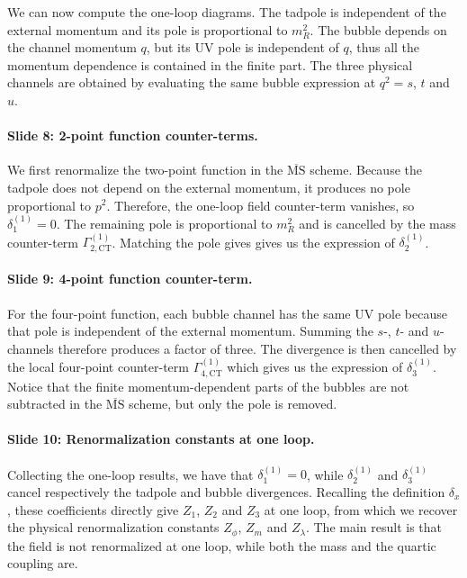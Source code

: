 \documentclass[11pt,a4paper]{article}
\newcommand{\MMS}{\overline{\mathrm{MS}}}
\begin{document}
We can now compute the one-loop diagrams. The tadpole is independent of the external momentum and its pole is proportional to $m_R^2$. The bubble depends on the channel momentum $q$, but its UV pole is independent of $q$, thus all the momentum dependence is contained in the finite part. 
The three physical channels are obtained by evaluating the same bubble expression at $q^2 = s $, $t$ and $u$.

\paragraph{Slide 8: 2-point function counter-terms.}

We first renormalize the two-point function in the $\MMS$ scheme. Because the tadpole does not depend on the external momentum, it produces no pole proportional to $p^2$. Therefore, the one-loop field counter-term vanishes, so $\delta_1^{(1)} = 0$. The remaining pole is proportional to $m_R^2$ and is cancelled by the mass counter-term $\Gamma_{2,\mathrm{CT}}^{(1)}$. Matching the pole gives gives us the expression of $\delta_2^{(1)}$.

\paragraph{Slide 9: 4-point function counter-term.}

For the four-point function, each bubble channel has the same UV pole because that pole is independent of the external momentum. Summing the $s$-, $t$- and $u$-channels therefore produces a factor of three. The divergence is then cancelled by the local four-point counter-term $\Gamma_{4,\mathrm{CT}}^{(1)}$ which gives us the expression of $\delta_3^{(1)}$. Notice that the finite momentum-dependent parts of the bubbles are not subtracted in the $\MMS$ scheme, but only the pole is removed.

\paragraph{Slide 10: Renormalization constants at one loop.}

Collecting the one-loop results, we have that $\delta_1^{(1)} = 0$, while $\delta_2^{(1)}$ and $\delta_3^{(1)}$ cancel respectively the tadpole and bubble divergences. Recalling the definition $\delta_x$, these coefficients directly give $Z_1$, $Z_2$ and $Z_3$ at one loop, from which we recover the physical renormalization constants $Z_\phi$, $Z_m$ and $Z_\lambda$. The main result is that the field is not renormalized at one loop, while both the mass and the quartic coupling are.
\end{document}
